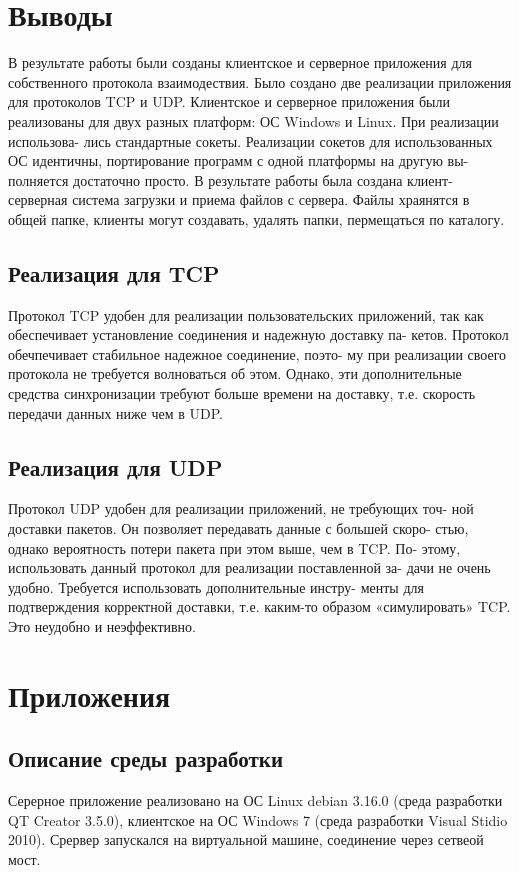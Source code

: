 \documentclass[12pt,a4paper]{report}
\begin{document}
\chapter{Выводы}
В результате работы были созданы клиентское и серверное приложения для собственного протокола взаимодествия. Было создано две реализации приложения для протоколов TCP и
UDP. Клиентское и серверное приложения были реализованы для двух
разных платформ: ОС Windows и Linux. При реализации использова-
лись стандартные сокеты. Реализации сокетов для использованных ОС
идентичны, портирование программ с одной платформы на другую вы-
полняется достаточно просто.
В результате работы была создана клиент-серверная система загрузки и приема файлов с сервера.
Файлы храянятся в общей папке, клиенты могут создавать, удалять папки, пермещаться по каталогу.
\section{Реализация для TCP}
Протокол TCP удобен для реализации пользовательских приложений,
так как обеспечивает установление соединения и надежную доставку па-
кетов. Протокол обечпечивает стабильное надежное соединение, поэто-
му при реализации своего протокола не требуется волноваться об этом.
Однако, эти дополнительные средства синхронизации требуют больше
времени на доставку, т.е. скорость передачи данных ниже чем в UDP.

\section{Реализация для UDP}
Протокол UDP удобен для реализации приложений, не требующих точ-
ной доставки пакетов. Он позволяет передавать данные с большей скоро-
стью, однако вероятность потери пакета при этом выше, чем в TCP. По-
этому, использовать данный протокол для реализации поставленной за-
дачи не очень удобно. Требуется использовать дополнительные инстру-
менты для подтверждения корректной доставки, т.е. каким-то образом
«симулировать» TCP. Это неудобно и неэффективно.
\chapter*{Приложения}
\section*{Описание среды разработки}
Серерное приложение реализовано на ОС Linux debian 3.16.0 (среда разработки QT Creator 3.5.0), клиентское на ОС Windows 7 (среда разработки Visual Stidio 2010). Срервер запускался на виртуальной машине, соединение через сетвеой мост.
\end{document}

